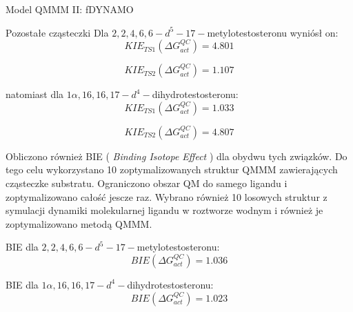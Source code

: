 \begin{section}{Model QMMM II: fDYNAMO}
\begin{subsection} { Pozostałe cząsteczki }
Dla $2,2,4,6,6-d^{5}-17-$metylotestosteron​u wyniósł on:
 \begin{equation}
    KIE_{TS1} \left( \Delta  G^{QC}_{act} \right) = 4.801
  \end{equation}
  
  \begin{equation}
    KIE_{TS2} \left( \Delta  G^{QC}_{act} \right) = 1.107 
  \end{equation}
 
natomiast dla $1\alpha,16,16,17-d^{4}-$dihydrotestosteronu:
 \begin{equation}
    KIE_{TS1} \left( \Delta  G^{QC}_{act} \right) = 1.033
  \end{equation}
  
  \begin{equation}
    KIE_{TS2} \left( \Delta  G^{QC}_{act} \right) = 4.807 
  \end{equation}
  
Obliczono również BIE ( \textit{Binding Isotope Effect} ) dla obydwu tych związków. Do tego celu wykorzystano 10 zoptymalizowanych struktur QMMM zawierających cząsteczke substratu. Ograniczono obszar QM
do samego ligandu i zoptymalizowano całość jescze raz. Wybrano również 10 losowych struktur z symulacji dynamiki molekularnej ligandu w roztworze wodnym i również je zoptymalizowano metodą QMMM.

BIE dla $2,2,4,6,6-d^{5}-17-$metylotestosteron​u:
 \begin{equation}
    BIE \left( \Delta  G^{QC}_{act} \right) = 1.036
  \end{equation}
  
 BIE dla $1\alpha,16,16,17-d^{4}-$dihydrotestosteronu:
 \begin{equation}
    BIE \left( \Delta  G^{QC}_{act} \right) = 1.023
  \end{equation}
 
\end{subsection}


\end{section}